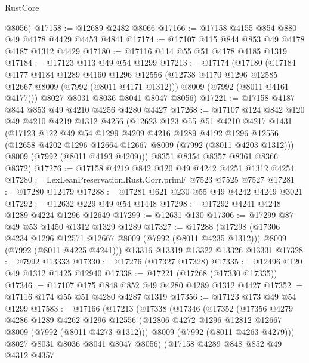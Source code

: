 \begin{lexlean}{RustCore}
\begin{coremodule}
      @8056)
@17158 := @12689 @2482 @8066
@17166 := @17158 @4155 @854 @880 @49 @4178 @4429 @4453 @4841
@17174 := @17107 @115 @844 @853 @49 @4178 @4187 @1312 @4429
@17180 := @17116 @114 @55 @51 @4178 @4185 @1319
@17184 := @17123 @113 @49 @54 @1299
@17213 := @17174
    (@17180
      (@17184
        @4177
        @4184
        @1289
        @4160
        @1296
        @12556
        (@12738 @4170 @1296 @12585 @12667 @8009 (@7992 (@8011 @4171 @1312)))
        @8009
        (@7992 (@8011 @4161 @4177)))
      @8027
      @8031
      @8036
      @8041
      @8047
      @8056)
@17221 := @17158 @4187 @844 @853 @49 @4210 @4256 @4280 @4427
@17268 := @17107
    @124
    @842
    @120
    @49
    @4210
    @4219
    @1312
    @4256
    (@12623
      @123
      @55
      @51
      @4210
      @4217
      @1431
      (@17123
        @122
        @49
        @54
        @1299
        @4209
        @4216
        @1289
        @4192
        @1296
        @12556
        (@12658 @4202 @1296 @12664 @12667 @8009 (@7992 (@8011 @4203 @1312)))
        @8009
        (@7992 (@8011 @4193 @4209)))
      @8351
      @8354
      @8357
      @8361
      @8366
      @8372)
@17276 := @17158 @4219 @842 @120 @49 @4242 @4251 @1312 @4254
@17280 := LexLeanPreservation.Rust.Corr.primF @7523 @7525 @7527
@17281 := @17280 @12479
@17288 := @17281 @621 @230 @55 @49 @4242 @4249 @3021
@17292 := @12632 @229 @49 @54 @1448
@17298 := @17292 @4241 @4248 @1289 @4224 @1296 @12649
@17299 := @12631 @130
@17306 := @17299 @87 @49 @53 @1450 @1312 @1329 @1289
@17327 := @17288
    (@17298
      (@17306 @4234 @1296 @12571 @12667 @8009 (@7992 (@8011 @4235 @1312)))
      @8009
      (@7992 (@8011 @4225 @4241)))
    @13316
    @13319
    @13322
    @13326
    @13331
@17328 := @7992 @13333
@17330 := @17276 (@17327 @17328)
@17335 := @12496 @120 @49 @1312 @1425 @12940
@17338 := @17221 (@17268 (@17330 @17335))
@17346 := @17107 @175 @848 @852 @49 @4280 @4289 @1312 @4427
@17352 := @17116 @174 @55 @51 @4280 @4287 @1319
@17356 := @17123 @173 @49 @54 @1299
@17583 := @17166
    (@17213
      (@17338
        (@17346
          (@17352
            (@17356
              @4279
              @4286
              @1289
              @4262
              @1296
              @12556
              (@12806 @4272 @1296 @12812 @12667 @8009 (@7992 (@8011 @4273 @1312)))
              @8009
              (@7992 (@8011 @4263 @4279)))
            @8027
            @8031
            @8036
            @8041
            @8047
            @8056)
          (@17158
            @4289
            @848
            @852
            @49
            @4312
            @4357

\end{coremodule}
\end{lexlean}
